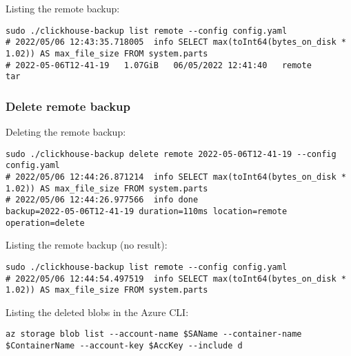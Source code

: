 Listing the remote backup:
\begin{verbatim}
sudo ./clickhouse-backup list remote --config config.yaml
# 2022/05/06 12:43:35.718005  info SELECT max(toInt64(bytes_on_disk * 1.02)) AS max_file_size FROM system.parts
# 2022-05-06T12-41-19   1.07GiB   06/05/2022 12:41:40   remote      tar
\end{verbatim}

\subsubsection{Delete remote backup}
\label{sec:org1dca49d}
Deleting the remote backup:
\begin{verbatim}
sudo ./clickhouse-backup delete remote 2022-05-06T12-41-19 --config config.yaml
# 2022/05/06 12:44:26.871214  info SELECT max(toInt64(bytes_on_disk * 1.02)) AS max_file_size FROM system.parts
# 2022/05/06 12:44:26.977566  info done                      backup=2022-05-06T12-41-19 duration=110ms location=remote operation=delete
\end{verbatim}

Listing the remote backup (no result):
\begin{verbatim}
sudo ./clickhouse-backup list remote --config config.yaml
# 2022/05/06 12:44:54.497519  info SELECT max(toInt64(bytes_on_disk * 1.02)) AS max_file_size FROM system.parts
\end{verbatim}

Listing the deleted blobs in the Azure CLI:
\begin{verbatim}
az storage blob list --account-name $SAName --container-name $ContainerName --account-key $AccKey --include d
\end{verbatim}

